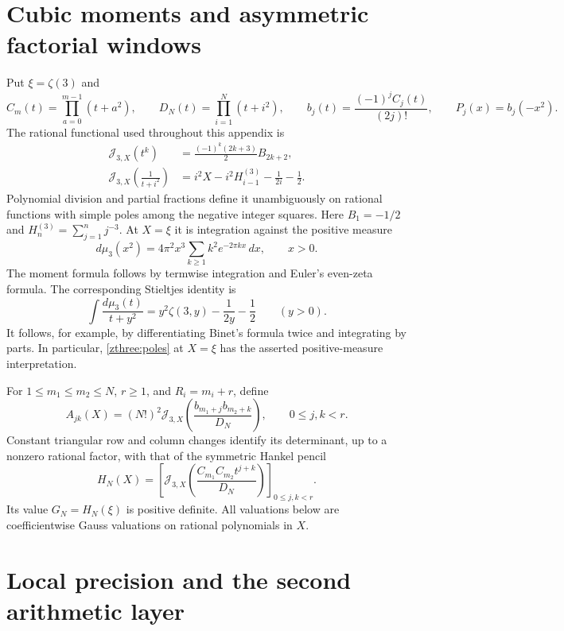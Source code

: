 \documentclass[11pt]{article}
\theoremstyle{definition}\newtheorem{definition}[theorem]{Definition}
\theoremstyle{remark}\newtheorem{remark}[theorem]{Remark}
\begin{document}
\section{Cubic moments and asymmetric factorial windows}
\label{zthree:setup}

Put $\xi=\zeta(3)$ and
\[
 C_m(t)=\prod_{a=0}^{m-1}(t+a^2),\qquad
 D_N(t)=\prod_{i=1}^N(t+i^2),\qquad
 b_j(t)=\frac{(-1)^jC_j(t)}{(2j)!},\qquad
 P_j(x)=b_j(-x^2).
\]
The rational functional used throughout this appendix is
\begin{align}
 \mathcal J_{3,X}(t^k)&=\frac{(-1)^k(2k+3)}2B_{2k+2},\label{zthree:moments}\\
 \mathcal J_{3,X}\left(\frac1{t+i^2}\right)
 &=i^2X-i^2H_{i-1}^{(3)}-\frac1{2i}-\frac12.\label{zthree:poles}
\end{align}
Polynomial division and partial fractions define it unambiguously on
rational functions with simple poles among the negative integer squares.
Here $B_1=-1/2$ and $H_n^{(3)}=\sum_{j=1}^n j^{-3}$.
At $X=\xi$ it is integration against the positive measure
\begin{equation}\label{zthree:measure}
 d\mu_3(x^2)=4\pi^2x^3\sum_{k\ge1}k^2e^{-2\pi kx}\,dx,
 \qquad x>0.
\end{equation}
The moment formula follows by termwise integration and Euler's even-zeta
formula. The corresponding Stieltjes identity is
\[
 \int\frac{d\mu_3(t)}{t+y^2}
   =y^2\zeta(3,y)-\frac1{2y}-\frac12\qquad(y>0).
\]
It follows, for example, by differentiating Binet's formula twice and
integrating by parts. In particular, \eqref{zthree:poles} at $X=\xi$
has the asserted positive-measure interpretation.

For $1\le m_1\le m_2\le N$, $r\ge1$, and $R_i=m_i+r$, define
\begin{equation}\label{zthree:matrix}
 A_{jk}(X)=(N!)^2\mathcal J_{3,X}
 \left(\frac{b_{m_1+j}b_{m_2+k}}{D_N}\right),\qquad 0\le j,k<r.
\end{equation}
Constant triangular row and column changes identify its determinant,
up to a nonzero rational factor, with that of the symmetric Hankel pencil
\begin{equation}\label{zthree:hankel}
 H_N(X)=\left[\mathcal J_{3,X}
 \left(\frac{C_{m_1}C_{m_2}t^{j+k}}{D_N}\right)\right]_{0\le j,k<r}.
\end{equation}
Its value $G_N=H_N(\xi)$ is positive definite. All valuations below are
coefficientwise Gauss valuations on rational polynomials in $X$.

\section{Local precision and the second arithmetic layer}
\label{zthree:local}
\end{document}
